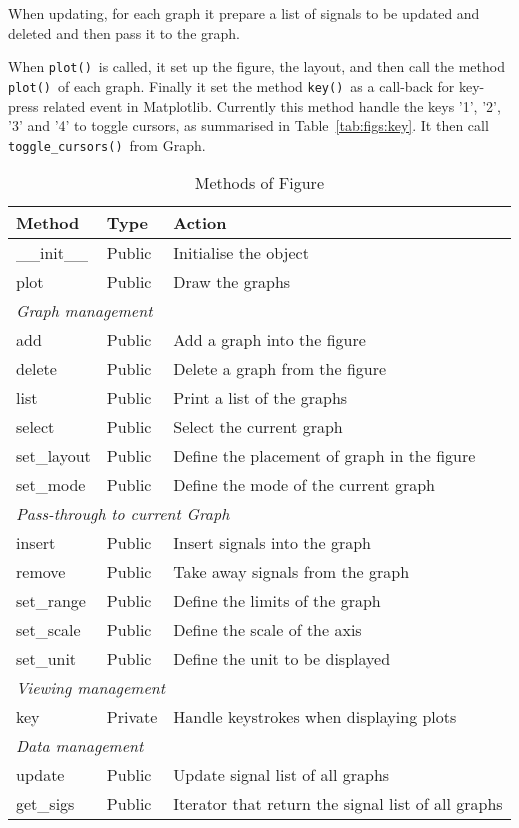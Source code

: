\documentclass[a4paper,11pt]{article}
\newcommand{\meth}[1]{\texttt{#1()}}
\newcommand{\cls}[1]{\textsf{#1}}
\newcommand{\graph}{\cls{Graph}}
\newcommand{\fig}{\cls{Figure}}
\begin{document}
When updating, for each graph it prepare a list of signals to be updated and deleted and then pass it to the graph.

When \meth{plot}\ is called, it set up the figure, the layout, and then call the method \meth{plot}\ of each graph.
Finally it set the method \meth{key}\ as a call-back for key-press related event in Matplotlib.
Currently this method handle the keys '1', '2', '3' and '4' to toggle cursors, as summarised in Table~\ref{tab:figs:key}.
It then call \meth{toggle\_cursors}\ from \graph.

\begin{table}[htbp]
  \centering\sf\small
  \begin{tabular}{lll}
    \hline
    Method & Type & Action \\
    \hline
    \_\_init\_\_ & Public & Initialise the object \\
    plot & Public & Draw the graphs\\
    \multicolumn{3}{l}{\textit{Graph management}} \\
    add & Public & Add a graph into the figure \\
    delete & Public & Delete a graph from the figure \\
    list & Public & Print a list of the graphs\\
    select & Public & Select the current graph \\
    set\_layout & Public & Define the placement of graph in the figure\\
    set\_mode & Public & Define the mode of the current graph\\
    \multicolumn{3}{l}{\textit{Pass-through to current Graph}} \\
    insert & Public & Insert signals into the graph\\
    remove & Public & Take away signals from the graph\\
    set\_range & Public & Define the limits of the graph\\
    set\_scale & Public & Define the scale of the axis\\
    set\_unit & Public & Define the unit to be displayed\\
    \multicolumn{3}{l}{\textit{Viewing management}} \\
    key & Private & Handle keystrokes when displaying plots \\
    \multicolumn{3}{l}{\textit{Data management}} \\
    update & Public & Update signal list of all graphs\\
    get\_sigs & Public & Iterator that return the signal list of all graphs\\
    \hline
  \end{tabular}
  \caption{Methods of \fig}
  \label{tab:figs:meth}
\end{table}
\end{document}
